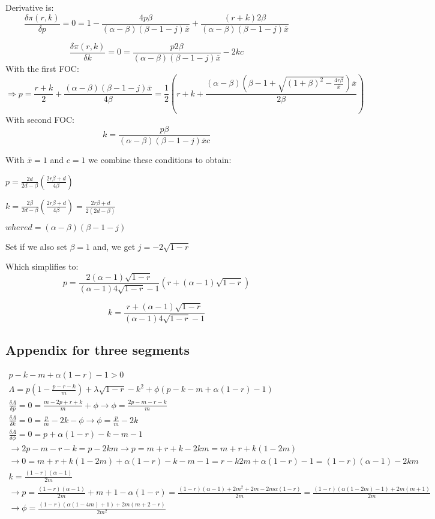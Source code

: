 \documentclass{article}
\begin{document}
Derivative is:
\[
\frac{\delta \pi(r,k)}{\delta p} 
= 0
= 1 - \frac{4p \beta}{(\alpha - \beta)( \beta -1- j)\overline{x}} +\frac{(r+k) 2\beta}{(\alpha - \beta)( \beta -1- j)\overline{x}}
\]

\[
\frac{\delta \pi(r,k)}{\delta k} 
= 0
=  \frac{p 2 \beta}{(\alpha - \beta) ( \beta  - 1 - j) \overline{x} } - 2kc 
\]
With the first FOC:
\[
\Rightarrow p = \frac{r+k}{2} +  \frac{(\alpha - \beta)( \beta -1- j)\overline{x}}{4 \beta}
=\frac{1}{2}\left(r+k + \frac{(\alpha - \beta)( \beta -1 + \sqrt{ (1+\beta)^{2}- \frac{4 r \beta}{\overline{x}}  })\overline{x}}{2 \beta}\right)
\]
With second FOC:
\[
k = \frac{p \beta}{(\alpha - \beta) ( \beta  - 1 - j) \overline{x} c}
\]

With $\overline{x}=1$ and $c=1$ we combine these conditions to obtain: 

$p=\frac{2d}{2d-\beta}\left(\frac{2 r \beta +d}{4 \beta} \right)$

$k = \frac{2 \beta }{2d-\beta}\left(\frac{2r\beta + d}{4 \beta} \right) = \frac{2r\beta + d}{2(2d-\beta)}$

$where d = (\alpha-\beta)(\beta -1-j)$

Set if we also set $\beta = 1$ and, we get $j=-2\sqrt{1-r}$

Which simplifies to: 
\[
p = \frac{2(\alpha-1)\sqrt{1-r}}{(\alpha-1)4\sqrt{1-r}-1}\left(r+(\alpha-1)\sqrt{1-r} \right)
\]

\[
k = \frac{r+(\alpha -1)\sqrt{1-r}}{(\alpha-1)4\sqrt{1-r}-1}
\]

\subsection{Appendix for three segments}

\[ 
\begin{array}{ll}
p-k-m+\alpha(1-r)-1>0 \\
\Lambda = p(1-\frac{p-r-k}{m})+\lambda \sqrt{1-r}-k^2+\phi(p-k-m+\alpha(1-r)-1) \\
\frac{\delta \Lambda}{\delta p} =0=\frac{m-2p+r+k}{m} + \phi \rightarrow \phi = \frac{2p-m-r-k}{m} \\
\frac{\delta \Lambda}{\delta k} =0= \frac{p}{m}-2k-\phi \rightarrow \phi = \frac{p}{m}-2k \\
\frac{\delta \Lambda}{\delta \phi} = 0 = p+\alpha(1-r)-k-m-1 \\
\rightarrow 2p-m-r-k=p-2km \rightarrow p=m+r+k-2km=m+r+k(1-2m) \\
\rightarrow 0 = m+r+k(1-2m)+\alpha(1-r)-k-m-1= r-k2m+\alpha(1-r)-1=(1-r)(\alpha-1)-2km \\
k = \frac{(1-r)(\alpha-1)}{2m} \\
\rightarrow p=\frac{(1-r)(\alpha-1)}{2m}+m+1-\alpha(1-r) = \frac{(1-r)(\alpha-1)+2m^2+2m-2m\alpha(1-r)}{2m} 
=\frac{(1-r)(\alpha(1-2m)-1)+2m(m+1)}{2m} \\
\rightarrow \phi = \frac{(1-r)(\alpha(1-4m) +1)+2m(m+2-r)}{2m^2}
\end{array}
\]
\end{document}
